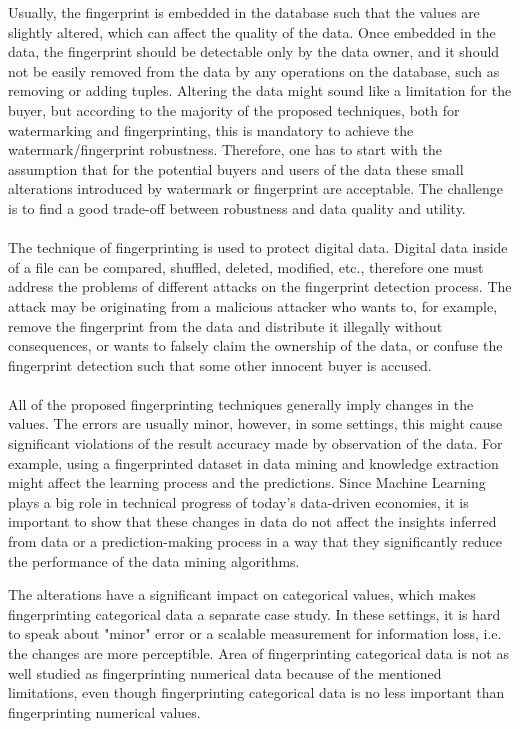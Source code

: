 Usually, the fingerprint is embedded in the database such that the values are slightly altered, which can affect the quality of the data.
Once embedded in the data, the fingerprint should be detectable only by the data owner, and it should not be easily removed from the data by any operations on the database, such as removing or adding tuples.  
Altering the data might sound like a limitation for the buyer, but according to the majority of the proposed techniques, both for watermarking and fingerprinting, this is mandatory to achieve the watermark/fingerprint robustness. 
Therefore, one has to start with the assumption that for the potential buyers and users of the data these small alterations introduced by watermark or fingerprint are acceptable.
The challenge is to find a good trade-off between robustness and data quality and utility. 
\paragraph{} 
The technique of fingerprinting is used to protect digital data. 
Digital data inside of a file can be compared, shuffled, deleted, modified, etc., therefore one must address the problems of different attacks on the fingerprint detection process. 
The attack may be originating from a malicious attacker who wants to, for example, remove the fingerprint from the data and distribute it illegally without consequences, or wants to falsely claim the ownership of the data, or confuse the fingerprint detection such that some other innocent buyer is accused.
\paragraph{}
All of the proposed fingerprinting techniques generally imply changes in the values. 
The errors are usually minor, however, in some settings, this might cause significant violations of the result accuracy made by observation of the data.
For example, using a fingerprinted dataset in data mining and knowledge extraction might affect the learning process and the predictions.
Since Machine Learning plays a big role in technical progress of today's data-driven economies, it is important to show that these changes in data do not affect the insights inferred from data or a prediction-making process in a way that they significantly reduce the performance of the data mining algorithms.

The alterations have a significant impact on categorical values, which makes fingerprinting categorical data a separate case study. 
In these settings, it is hard to speak about "minor" error or a scalable measurement for information loss, i.e. the changes are more perceptible. 
Area of fingerprinting categorical data is not as well studied as fingerprinting numerical data because of the mentioned limitations, even though fingerprinting categorical data is no less important than fingerprinting numerical values. 
